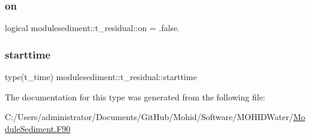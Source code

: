 \mbox{\label{structmodulesediment_1_1t__residual_adbf01e0942f04b240c04847614c1da96}} 
\subsubsection{\texorpdfstring{on}{on}}
{\footnotesize\ttfamily logical modulesediment\+::t\+\_\+residual\+::on = .false.\hspace{0.3cm}{\ttfamily [private]}}

\mbox{\label{structmodulesediment_1_1t__residual_af498bd14badc046aa1127017f0e13dec}} 
\subsubsection{\texorpdfstring{starttime}{starttime}}
{\footnotesize\ttfamily type(t\+\_\+time) modulesediment\+::t\+\_\+residual\+::starttime\hspace{0.3cm}{\ttfamily [private]}}



The documentation for this type was generated from the following file\+:\begin{DoxyCompactItemize}
\item 
C\+:/\+Users/administrator/\+Documents/\+Git\+Hub/\+Mohid/\+Software/\+M\+O\+H\+I\+D\+Water/\mbox{\hyperlink{_module_sediment_8_f90}{Module\+Sediment.\+F90}}\end{DoxyCompactItemize}
